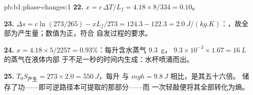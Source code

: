 \begin{solution}{pb:b1:phase-changes:1}
\textbf{22.} $x = c\,\Delta T/L_f = 4.18 \times 8/334 = 0.10$。

\textbf{23.} $\Delta s = c\ln(273/265) - xL_f/273 = 124.3 - 122.3 =
\qty{+2.0}{J/(kg.K)}$：，故全部为产生量；数值为正，符合
自发过程的要求。

\textbf{24.} $x = 4.18 \times 5/2257 = 0.93\%$：每升含水蒸气 \qty{9.3}{g}，
$9.3 \times 10^{-3} \times 1.67 = \qty{16}{L}$ 的蒸气在液体内部
于不足一秒的时间内生成：水杯喷涌而出。

\textbf{25.} $T_0S_{\text{产生}} = 273 \times 2.0 = \qty{550}{J}$，每升
与 $mgh = \qty{9.8}{J}$ 相比，是其五十六倍。
储存了功——即可逆路径本可提取的那部分——而
一次轻敲便将其全部转化为熵。
\end{solution}
